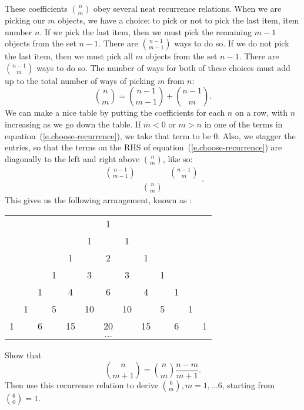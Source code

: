 These coefficients $n\choose m$ obey several neat recurrence relations. When we are picking our $m$ objects, we have a choice: to pick or not to pick the last item, item number $n$. If we pick the last item, then we must pick the remaining $m-1$ objects from the set $n-1$.  There are ${n-1\choose m-1}$ ways to do so.  If we do not pick the last item, then we must pick all $m$ objects from the set $n-1$. There are ${n-1\choose m}$ ways to do so.  The number of ways for both of these choices must add up to the total number of ways of picking $m$ from $n$:
\begin{equation}\label{e.choose-recurrence}
{n\choose m} = {n-1\choose m-1} + {n-1\choose m}.
\end{equation}
We can make a nice table by putting the coefficients for each $n$ on a row, with $n$ increasing as we go down the table. If $m<0$ or $m>n$ in one of the terms in equation~(\ref{e.choose-recurrence}), we take that term to be 0.  Also, we stagger the entries, so that the terms on the RHS of equation~(\ref{e.choose-recurrence}) are diagonally to the left and right above ${n\choose m}$, like so:
\[ \begin{array}{ccc}{n-1\choose m-1} &  & {n-1\choose m} \\ & {n\choose m} & \end{array}. \]
This gives us the following arrangement, known as :
\begin{center}
\begin{tabular}{ccccccccccccc}
	&	&	&	&	&	& 1	&	&	&	&	&	&	\\
	&	&	&	&	& 1	& 	& 1	&	&	&	&	&	\\
	&	&	&	& 1	& 	& 2	& 	& 1	&	&	&	&	\\
 	&	&	& 1	& 	& 3	&	& 3	&	& 1	&	&	&	\\
	&	& 1	&	& 4	&	& 6	&	& 4	& 	& 1	&	&	\\
	& 1	&	& 5	&	& 10&	&10	&	& 5	&	& 1	&	\\
1	&	& 6	&	& 15&	&20	&	&15	&	& 6	&	& 1	\\			
	&	&	&	&	&	&$\ldots$&	&	&	&	& &	\\
\end{tabular}
\end{center}

\begin{exercisebox}
Show that
\[ {n\choose m+1} = {n\choose m} \frac{n-m}{m+1}. \]
Then use this recurrence relation to derive ${6\choose m}, m=1,\ldots 6$, starting from ${6\choose 0} = 1$.
\end{exercisebox}

